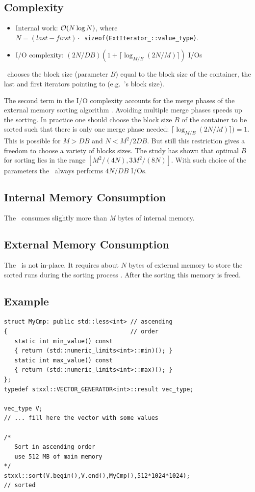 \documentclass[twoside]{book}
\begin{document}
\subsection*{Complexity}
\label{sortcomplexity}
\begin{itemize}
\item Internal work: $\mathcal{O}\!\left( N \log N\right)$, where \\$N = (last -
first)\cdot$~\texttt{sizeof(ExtIterator\_::value\_type)}.
\item I/O complexity: $(2N/DB)(1 + \lceil {\log}_{M/B}(2N/M) \rceil)$ I/Os
\end{itemize}

\xsort\ chooses the block size (parameter $B$) equal to the block size
of the container, the last and first iterators pointing to
(e.g.\ \xvector's block size).

The second term in the I/O complexity accounts for the merge phases of
the external memory sorting algorithm \cite{DemSan03}. Avoiding
multiple merge phases  
speeds up the sorting. In practice one should choose the block size
$B$ of the container to be 
sorted such that there is only one merge phase needed: $\lceil
{\log}_{M/B}(2N/M) \rceil) = 1$. This is 
possible for $M > DB$ and $N < M^2/2DB$. But still this restriction
gives a freedom to choose a variety of blocks sizes. The study
\cite{DemSan03} has shown that optimal $B$ for sorting lies in the
range $[M^2/(4N),3M^2/(8N)]$. With such choice of the parameters the
\xsort\ always performs $4N/DB$ I/Os.

\subsection*{Internal Memory Consumption}
\label{sortimem}
The \xsort\ consumes slightly more than \emph{M} bytes of internal
memory. 

\subsection*{External Memory Consumption}
\label{sortemem}
The \xsort\ is not in-place. It requires about $N$ bytes of external
memory to store the sorted runs during the sorting process
\cite{DemSan03}. After the sorting this memory is freed.

\subsection*{Example}
\begin{lstlisting}
struct MyCmp: public std::less<int> // ascending
{                                   // order
   static int min_value() const  
   { return (std::numeric_limits<int>::min)(); }
   static int max_value() const  
   { return (std::numeric_limits<int>::max)(); }
};
typedef stxxl::VECTOR_GENERATOR<int>::result vec_type;

vec_type V;
// ... fill here the vector with some values

/*
   Sort in ascending order
   use 512 MB of main memory
*/
stxxl::sort(V.begin(),V.end(),MyCmp(),512*1024*1024);
// sorted
\end{lstlisting}
\end{document}

